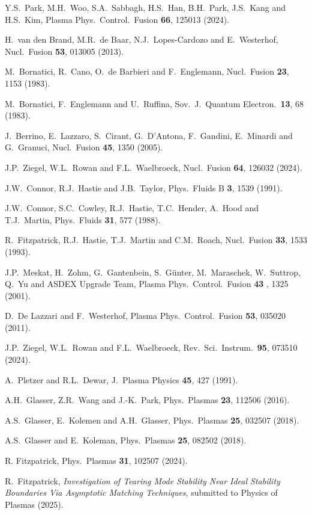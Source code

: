 \documentclass{iopjournal}
\begin{document}
\begin{thebibliography}{99}
 Y.S.~Park, M.H.~Woo, S.A.~Sabbagh, H.S.~Han, B.H.~Park, J.S.~Kang and H.S.~Kim,  Plasma Phys.\ Control.\ Fusion {\bf 66}, 125013 (2024).

 H.~van den Brand, M.R.~de Baar, N.J.~Lopes-Cardozo and E.~Westerhof, Nucl.\ Fusion {\bf 53}, 013005 (2013). 
  
 M.~Bornatici, R.~Cano, O.~de Barbieri and F.~Englemann, Nucl.\ Fusion {\bf 23}, 1153 (1983). 

 M.~Bornatici, F.~Englemann and U.~Ruffina, Sov.\ J.\ Quantum Electron.\ {\bf 13}, 68 (1983).

 J.~Berrino, E.~Lazzaro, S.~Cirant, G.~D'Antona, F.~Gandini, E.~Minardi and G.~Granuci, Nucl.\ Fusion {\bf 45}, 1350 (2005).

 J.P.~Ziegel, W.L.~Rowan and F.L.~Waelbroeck, Nucl.\ Fusion {\bf 64}, 126032 (2024).

 J.W.~Connor, R.J.~Hastie and J.B.~Taylor, Phys.\ Fluids B {\bf 3}, 1539 (1991).

 J.W.~Connor,  S.C.~Cowley, R.J.~Hastie,  T.C.~Hender,  A.~Hood  and T.J.~Martin,  Phys.\ Fluids {\bf 31}, 577 (1988).

 R.~Fitzpatrick, R.J.~Hastie, T.J.~Martin and C.M.~Roach, Nucl.\ Fusion {\bf 33}, 1533 (1993).

 J.P.~Meskat, H.~Zohm, G.~Gantenbein, S.~G\"{u}nter, M.~Maraschek, W.~Suttrop, Q.~Yu and ASDEX Upgrade Team, Plasma Phys.\ Control.\ Fusion {\bf 43} , 1325 (2001).

 D.~De Lazzari and F.~Westerhof, Plasma Phys.\ Control.\ Fusion {\bf 53}, 035020 (2011).

 J.P.~Ziegel, W.L.~Rowan and F.L.~Waelbroeck, Rev.\ Sci.\ Instrum.\ {\bf 95}, 073510 (2024).

 A.~Pletzer and R.L.~Dewar, J.\ Plasma Physics {\bf 45}, 427 (1991).

 A.H.~Glasser, Z.R.~Wang and J.-K.~Park, Phys.\ Plasmas {\bf 23}, 112506 (2016).

 A.S.~Glasser, E.~Kolemen and A.H.~Glasser, Phys.\ Plasmas {\bf 25}, 032507 (2018).

 A.S.~Glasser and E.~Koleman, Phys.\ Plasmas {\bf 25}, 082502 (2018). 

 R. Fitzpatrick, Phys.\ Plasmas {\bf 31}, 102507 (2024).

 R.~Fitzpatrick,  {\em Investigation of  Tearing Mode Stability Near Ideal Stability Boundaries Via Asymptotic Matching Techniques}, submitted
to Physics of Plasmas (2025).


\end{thebibliography}
\end{document}
